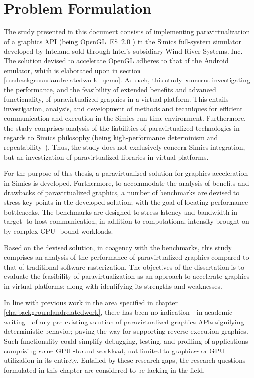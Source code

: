 
\section{Problem Formulation}
\label{sec:problemformulation}
The study presented in this document consists of implementing paravirtualization of a graphics API (being OpenGL~ES~$2.0$ ) in the Simics full-system simulator developed by Intel\circledR and sold through Intel\circledR 's subsidiary Wind River Systems, Inc. 
The solution devised to accelerate OpenGL adheres to that of the Android emulator, which is elaborated upon in section \ref{sec:backgroundandrelatedwork_qemu}.
As such, this study concerns investigating the performance, and the feasibility of extended benefits and advanced functionality, of paravirtualized graphics in a virtual platform.
This entails investigation, analysis, and development of methods and techniques for efficient communication and execution in the Simics run-time environment.
Furthermore, the study comprises analysis of the liabilities of paravirtualized technologies in regards to Simics philosophy (being high-performance determinism and repeatability~).
Thus, the study does not exclusively concern Simics integration, but an investigation of paravirtualized libraries in virtual platforms.

For the purpose of this thesis, a paravirtualized solution for graphics acceleration in Simics is developed.
Furthermore, to accommodate the analysis of benefits and drawbacks of paravirtualized graphics, a number of benchmarks are devised to stress key points in the developed solution; with the goal of locating performance bottlenecks.
The benchmarks are designed to stress latency and bandwidth in target -to-host communication, in addition to computational intensity brought on by complex GPU -bound workloads.

Based on the devised solution, in coagency with the benchmarks, this study comprises an analysis of the performance of paravirtualized graphics compared to that of traditional software rasterization.
The objectives of the dissertation is to evaluate the feasibility of paravirtualization as an approach to accelerate graphics in virtual platforms; along with identifying its strengths and weaknesses.

In line with previous work in the area specified in chapter \ref{cha:backgroundandrelatedwork}, there has been no indication - in academic writing - of any pre-existing solution of paravirtualized graphics APIs signifying deterministic behavior; paving the way for supporting reverse execution graphics.
Such functionality could simplify debugging, testing, and profiling of applications comprising some GPU -bound workload; not limited to graphics- or GPU utilization in its entirety.
Entailed by these research gaps, the research questions formulated in this chapter are considered to be lacking in the field.

